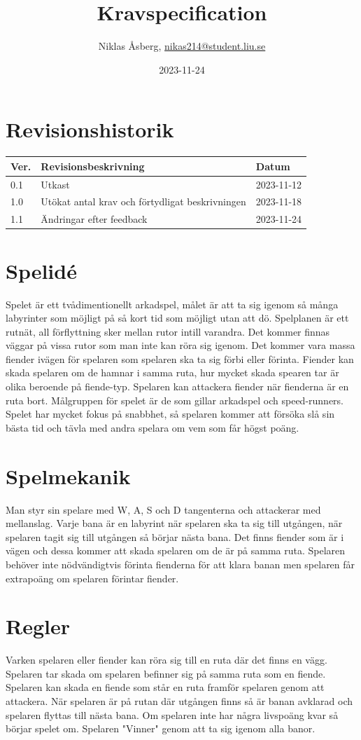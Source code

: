 \documentclass{TDP005mall}
\author{Niklas Åsberg, \url{nikas214@student.liu.se}}
\title{Kravspecification}
\date{2023-11-24}
\begin{document}
\projectpage
\section{Revisionshistorik}
\begin{table}[!h]
\begin{tabularx}{\linewidth}{|l|X|l|}
\hline
Ver. & Revisionsbeskrivning & Datum \\\hline
0.1 & Utkast & 2023-11-12 \\\hline
1.0 & Utökat antal krav och förtydligat beskrivningen & 2023-11-18 \\\hline
1.1 & Ändringar efter feedback & 2023-11-24 \\\hline
\end{tabularx}
\end{table}

\tableofcontents
\newpage

\section{Spelidé}
Spelet är ett tvådimentionellt arkadspel, målet är att ta sig igenom så många labyrinter som möjligt på så kort tid som möjligt utan att dö.
Spelplanen är ett rutnät, all förflyttning sker mellan rutor intill varandra. Det kommer finnas väggar på vissa rutor som man inte kan röra sig igenom.
Det kommer vara massa fiender ivägen för spelaren som spelaren ska ta sig förbi eller förinta. 
Fiender kan skada spelaren om de hamnar i samma ruta, hur mycket skada spearen tar är olika beroende på fiende-typ.
Spelaren kan attackera fiender när fienderna är en ruta bort.
Målgruppen för spelet är de som gillar arkadspel och speed-runners.
Spelet har mycket fokus på snabbhet, så spelaren kommer att försöka slå sin bästa tid och tävla med andra spelara om vem som får högst poäng.

\section{Spelmekanik}
Man styr sin spelare med W, A, S och D tangenterna och attackerar med mellanslag. Varje bana är en labyrint när spelaren ska ta sig till utgången, när spelaren tagit sig till utgången så börjar nästa bana.
Det finns fiender som är i vägen och dessa kommer att skada spelaren om de är på samma ruta.
Spelaren behöver inte nödvändigtvis förinta fienderna för att klara banan men spelaren får extrapoäng om spelaren förintar fiender.

\section{Regler}
Varken spelaren eller fiender kan röra sig till en ruta där det finns en vägg.
Spelaren tar skada om spelaren befinner sig på samma ruta som en fiende.
Spelaren kan skada en fiende som står en ruta framför spelaren genom att attackera.
När spelaren är på rutan där utgången finns så är banan avklarad och spelaren flyttas till nästa bana.
Om spelaren inte har några livspoäng kvar så börjar spelet om.
Spelaren "Vinner" genom att ta sig igenom alla banor.
\end{document}
